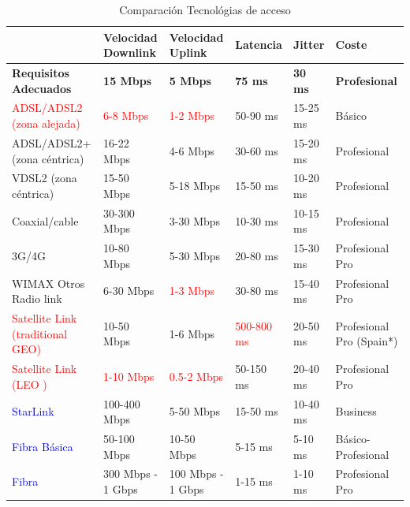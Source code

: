 \begin{table}[htb]
    \centering
    \label{T:comp_conexion_tech}
    \caption{Comparación Tecnológias de acceso}
    \begin{tabular}{|p{2.5cm}|p{2cm}|p{2cm}|p{1.75cm}|p{1.75cm}|p{2cm}|}
    \hline \hline 
        ~ & \textbf{Velocidad Downlink} & \textbf{Velocidad Uplink}  & \textbf{Latencia} & \textbf{Jitter} & \textbf{Coste} \\ \hline
        \textbf{Requisitos Adecuados} & \textbf{15 Mbps}  & \textbf{5 Mbps}  & \textbf{75 ms } & \textbf{30 ms}  & \textbf{Profesional}  \\ \hline
        \textcolor{red}{ADSL/ADSL2 (zona alejada)}\cite{c_dsl_tech}  & \textcolor{red}{6-8 Mbps}  & \textcolor{red}{1-2 Mbps}  & \textcolor{naranja}{50-90 ms}  & 15-25 ms  & Básico  \\ \hline
        \textcolor[cmyk]{1,0,1,0}{ADSL/ADSL2+ (zona céntrica) }\cite{c_dsl_tech}  & 16-22 Mbps  & 4-6 Mbps  & 30-60 ms  & 15-20 ms  & Profesional  \\ \hline
        \textcolor[cmyk]{1,0,1,0}{VDSL2 (zona céntrica) }\cite{c_dsl_tech}  & 15-50 Mbps  & 5-18 Mbps  & 15-50 ms  & 10-20 ms  & Profesional  \\ \hline
        \textcolor[cmyk]{1,0,1,0}{Coaxial/cable}  & 30-300 Mbps  & 3-30 Mbps  & 10-30 ms  & 10-15 ms  & Profesional  \\ \hline
        \textcolor{naranja}{3G/4G}  & \textcolor{naranja}{10-80 Mbps}  & 5-30 Mbps  & \textcolor{naranja}{20-80 ms}  & 15-30 ms  & Profesional Pro  \\ \hline
        \textcolor{naranja}{WIMAX Otros Radio link}\cite{c_wimax_tech}  & \textcolor{naranja}{6-30 Mbps}  & \textcolor{red}{1-3 Mbps}  & \textcolor{naranja}{30-80 ms}  & \textcolor{naranja}{15-40 ms}  & Profesional Pro  \\ \hline
        \textcolor{red}{Satellite Link (traditional GEO)} & 10-50 Mbps  & \textcolor{naranja}{1-6 Mbps}  & \textcolor{red}{500-800 ms}  & \textcolor{naranja}{20-50 ms}  & Profesional Pro (Spain*)  \\ \hline
        \textcolor{red}{Satellite Link (LEO )}  & \textcolor{red}{1-10 Mbps}  & \textcolor{red}{0.5-2 Mbps}  & \textcolor{naranja}{50-150 ms}  & \textcolor{naranja}{20-40 ms}  & Profesional Pro  \\ \hline
        \textcolor{blue}{StarLink}\cite{c_starlink_tech}  & 100-400 Mbps  & 5-50 Mbps  & 15-50 ms  & 10-40 ms  & Business  \\ \hline
        \textcolor{blue}{Fibra Básica}  & 50-100 Mbps  & 10-50 Mbps  & 5-15 ms  & 5-10 ms  & Básico-Profesional  \\ \hline
        \textcolor{blue}{Fibra}  & 300 Mbps - 1 Gbps  & 100 Mbps - 1 Gbps   & 1-15 ms  & 1-10 ms  & Profesional Pro  \\ \hline
    \end{tabular}
\end{table}

